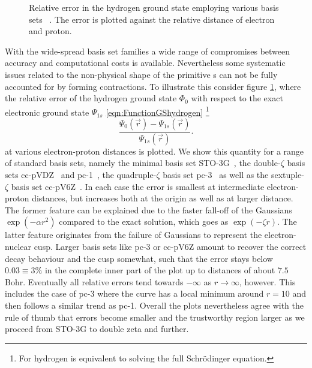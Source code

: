 \begin{figure}
	\centering
	\caption[Relative error in the hydrogen \HF ground state
		for a range of \cGTO basis sets]
	{Relative error in the hydrogen \HF ground state
		employing various \cGTO basis sets~%
		\cite{Hehre1969,Dunning1989,Jensen2001,Wilson1996}.
		The error is plotted against
		the relative distance of electron and proton.
	}
	\label{fig:RelativeErrorCgto}
\end{figure}
With the wide-spread \cGTO basis set families
a wide range of compromises between accuracy and computational costs is available.
Nevertheless some systematic issues related to the non-physical shape
of the primitive {\GTO}s can not be fully accounted for by forming contractions.
To illustrate this consider figure \ref{fig:RelativeErrorCgto},
where the
relative error of the hydrogen \HF ground state $\Phi_0$
with respect to the exact
electronic ground state $\Psi_{1s}$ \eqref{eqn:FunctionGShydrogen}%
\footnote{For hydrogen \HF is equivalent to solving the full Schrödinger equation.}
\[ \frac{\Psi_0(\vec{r}) - \Psi_{1s}(\vec{r})}{\Psi_{1s}(\vec{r})}. \]
at various electron-proton distances is plotted.
We show this quantity for a range of standard \cGTO basis sets,
namely the minimal basis set STO-3G~\cite{Hehre1969},
the double-$\zeta$ basis sets cc-pVDZ~\cite{Dunning1989}
and pc-1~\cite{Jensen2001},
the quadruple-$\zeta$ basis set pc-3~\cite{Jensen2001}
as well as the sextuple-$\zeta$ basis set cc-pV6Z~\cite{Wilson1996}.
In each case the error is smallest at intermediate
electron-proton distances, but increases both at the origin
as well as at larger distance.
The former feature can be explained due to the faster fall-off
of the Gaussians $\exp(-\alpha r^2)$ compared to the exact solution,
which goes as $\exp(-\zeta r)$.
The latter feature originates from the failure of Gaussians
to represent the electron-nuclear cusp.
Larger basis sets like pc-3 or cc-pV6Z amount to recover the
correct decay behaviour and the cusp somewhat,
such that the error stays below $0.03 \equiv 3\%$
in the complete inner part of the plot up to distances
of about $7.5$ Bohr.
Eventually all relative errors tend towards $-\infty$ as $r \to \infty$,
however.
This includes the case of pc-3
where the curve has a local minimum around $r = 10$ and then follows a similar
trend as pc-1.
Overall the plots nevertheless agree with the rule of thumb
that errors become smaller and the trustworthy region larger
as we proceed from STO-3G to double zeta and further.

